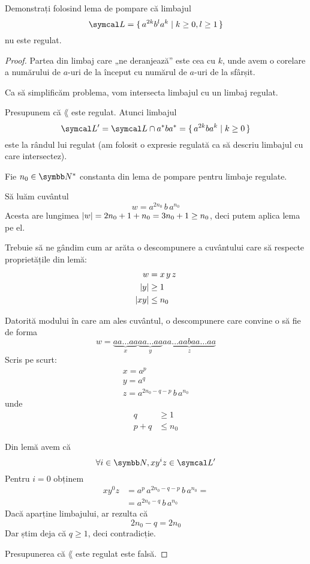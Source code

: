 \begin{exercise}
    Demonstrați folosind lema de pompare că limbajul
    \[\lang = \set{ a^{2k} b^l a^{k} | k \geq 0, l \geq 1 }\]
    nu este regulat.
\end{exercise}
\begin{proof}
    Partea din limbaj care „ne deranjează” este cea cu \(k\), unde avem o corelare a numărului de \(a\)-uri de la început cu numărul de \(a\)-uri de la sfârșit.

    Ca să simplificăm problema, vom intersecta limbajul cu un limbaj regulat.

    Presupunem că \(\lang\) este regulat. Atunci limbajul
    \[\lang' = \lang \cap a^* b a^* = \set{ a^{2k} b a^k | k \geq 0 }\]
    este la rândul lui regulat (am folosit o expresie regulată ca să descriu limbajul cu care intersectez).

    Fie \(n_0 \in \naturals^*\) constanta din lema de pompare pentru limbaje regulate.

    Să luăm cuvântul
    \[w = a^{2 n_0} \, b \, a^{n_0}\]
    Acesta are lungimea \(\left\lvert w\right\rvert = 2 n_0 + 1 + n_0 = 3n_0 + 1 \geq n_0\), deci putem aplica lema pe el.

    Trebuie să ne gândim cum ar arăta o descompunere a cuvântului care să respecte proprietățile din lemă:
    \begin{align*}
        w        & = x \, y \, z \\
        \left\lvert y\right\rvert  & \geq 1        \\
        \left\lvert xy\right\rvert & \leq n_0
    \end{align*}

    Datorită modului în care am ales cuvântul, o descompunere care convine o să fie de forma
    \[
        w = \underbrace{aa \dots aa}_{x}
        \underbrace{aa \dots aa}_{y}
        \underbrace{aa \dots aa b aa \dots aa}_{z}
    \]
    Scris pe scurt:
    \begin{gather*}
        x = a^p \\
        y = a^q \\
        z = a^{2 n_0 - q - p} \, b \, a^{n_0}
    \end{gather*}
    unde
    \begin{align*}
        q     & \geq 1   \\
        p + q & \leq n_0
    \end{align*}

    Din lemă avem că
    \[\forall i \in \naturals, x y^i z \in \lang'\]
    Pentru \(i = 0\) obținem
    \begin{align*}
        x y^0 z & = a^p \, a^{2 n_0 - q - p} \, b \, a^{n_0} = \\
                & = a^{2 n_0 - q} \, b \, a^{n_0}
    \end{align*}
    Dacă aparține limbajului, ar rezulta că
    \[2 n_0 - q = 2 n_0\]
    Dar știm deja că \(q \geq 1\), deci contradicție.

    Presupunerea că \(\lang\) este regulat este falsă.
\end{proof}

